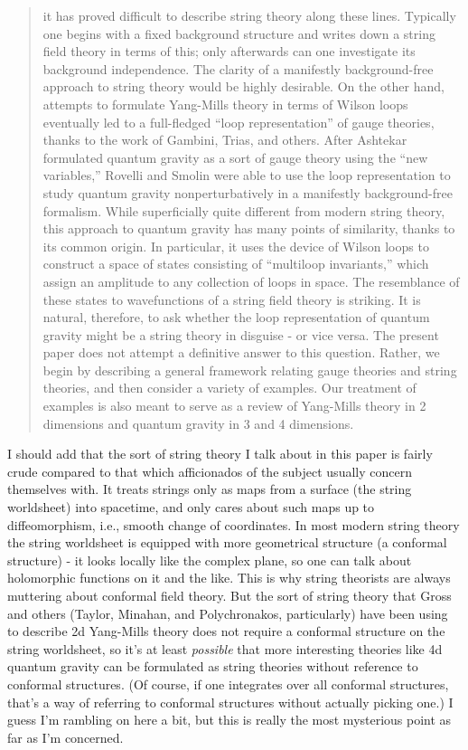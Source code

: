\begin{quote}
it has proved difficult to describe string theory along these lines.
Typically one begins with a fixed background structure and writes down
a string field theory in terms of this; only afterwards can one
investigate its background independence.  The clarity of a manifestly
background-free approach to string theory would be highly desirable.  
On the other hand, attempts to formulate Yang-Mills theory in terms of
Wilson loops eventually led to a full-fledged ``loop representation'' of
gauge theories, thanks to the work of Gambini, Trias, and
others.   After Ashtekar formulated quantum gravity as a sort of gauge
theory using the ``new variables,''  Rovelli and Smolin were able to use
the loop representation to study quantum gravity nonperturbatively in a
manifestly background-free formalism.   While superficially
quite different from modern string theory, this approach to quantum gravity
has many points of similarity, thanks to its common origin.  In particular,
it uses the device of Wilson loops to construct a space of states
consisting of ``multiloop invariants,'' which assign an amplitude to any
collection of loops in space.  The resemblance of these states to
wavefunctions of a string field theory is striking.  It is natural,
therefore, to ask whether the loop representation of quantum gravity might
be a string theory in disguise - or vice versa.  
The present paper does not attempt a definitive answer to this question.
Rather, we begin by describing a general framework relating gauge theories and 
string theories, and then consider a variety of examples.  Our treatment of
examples is also meant to serve as a review of Yang-Mills theory in 2
dimensions and quantum gravity in 3 and 4 dimensions. 
\end{quote}

I should add that the sort of string theory I talk about in this paper
is fairly crude compared to that which afficionados of the subject
usually concern themselves with.  It treats strings only as maps from a
surface (the string worldsheet) into spacetime, and only cares about
such maps up to diffeomorphism, i.e., smooth change of coordinates.  In
most modern string theory the string worldsheet is equipped with more
geometrical structure (a conformal structure) - it looks locally like
the complex plane, so one can talk about holomorphic functions on it and
the like.  This is why string theorists are always muttering about
conformal field theory.  But the sort of string theory that Gross and others
(Taylor, Minahan, and Polychronakos, particularly) have been using to
describe 2d Yang-Mills theory does not require a conformal structure on
the string worldsheet, so it's at least \emph{possible} that more interesting
theories like 4d quantum gravity can be formulated as string theories
without reference to conformal structures.  (Of course, if one
integrates over all conformal structures, that's a way of referring to
conformal structures without actually picking one.)  I guess I'm
rambling on here a bit, but this is really the most mysterious point as
far as I'm concerned.  

